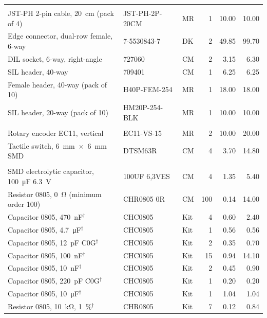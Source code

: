{\begin{xltabular}{\textwidth}{@{}>{\raggedright\arraybackslash}X l l r r r@{}}
  \addlinespace
   \\
  JST-PH 2-pin cable, \SI{20}{\centi\metre} (pack of 4) & JST-PH-2P-20CM & MR & 1 & 10.00 & 10.00 \\
  Edge connector, dual-row female, 6-way & 7-5530843-7 & DK & 2 & 49.85 & 99.70 \\
  DIL socket, 6-way, right-angle & 727060 & CM & 2 & 3.15 & 6.30 \\
  SIL header, 40-way & 709401 & CM & 1 & 6.25 & 6.25 \\
  Female header, 40-way (pack of 10) & H40P-FEM-254 & MR & 1 & 18.00 & 18.00 \\
  SIL header, 20-way (pack of 10) & HM20P-254-BLK & MR & 1 & 10.00 & 10.00 \\
  \addlinespace
   \\
  Rotary encoder EC11, vertical & EC11-VS-15 & MR & 2 & 10.00 & 20.00 \\
  Tactile switch, \SI{6}{\milli\metre}~$\times$~\SI{6}{\milli\metre} SMD & DTSM63R & CM & 4 & 3.70 & 14.80 \\
  \addlinespace
   \\
  SMD electrolytic capacitor, \SI{100}{\micro\farad} \SI{6.3}{\volt} & 100UF 6,3VES & CM & 4 & 1.35 & 5.40 \\
  Resistor 0805, \SI{0}{\ohm} (minimum order 100) & CHR0805 0R & CM & 100 & 0.14 & 14.00 \\
  Capacitor 0805, \SI{470}{\nano\farad}$^{\dagger}$ & CHC0805 & Kit & 4 & 0.60 & 2.40 \\
  Capacitor 0805, \SI{4.7}{\micro\farad}$^{\dagger}$ & CHC0805 & Kit & 1 & 0.56 & 0.56 \\
  Capacitor 0805, \SI{12}{\pico\farad} C0G$^{\dagger}$ & CHC0805 & Kit & 2 & 0.35 & 0.70 \\
  Capacitor 0805, \SI{100}{\nano\farad}$^{\dagger}$ & CHC0805 & Kit & 15 & 0.94 & 14.10 \\
  Capacitor 0805, \SI{10}{\nano\farad}$^{\dagger}$ & CHC0805 & Kit & 2 & 0.45 & 0.90 \\
  Capacitor 0805, \SI{220}{\pico\farad} C0G$^{\dagger}$ & CHC0805 & Kit & 1 & 0.20 & 0.20 \\
  Capacitor 0805, \SI{10}{\micro\farad}$^{\dagger}$ & CHC0805 & Kit & 1 & 1.04 & 1.04 \\
  Resistor 0805, \SI{10}{\kilo\ohm}, \SI{1}{\percent}$^{\dagger}$ & CHR0805 & Kit & 7 & 0.12 & 0.84 \\

\end{xltabular}}
